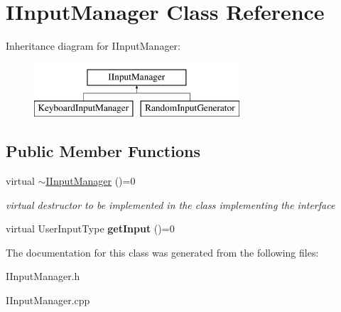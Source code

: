 \hypertarget{class_i_input_manager}{}\section{I\+Input\+Manager Class Reference}
\label{class_i_input_manager}
Inheritance diagram for I\+Input\+Manager\+:\begin{figure}[H]
\begin{center}
\leavevmode
\includegraphics[height=2.000000cm]{class_i_input_manager}
\end{center}
\end{figure}
\subsection*{Public Member Functions}
\begin{DoxyCompactItemize}
\item 
\mbox{\label{class_i_input_manager_aa81a10b1ddf305df10c4aebe6930ac86}} 
virtual \mbox{\hyperlink{class_i_input_manager_aa81a10b1ddf305df10c4aebe6930ac86}{$\sim$\+I\+Input\+Manager}} ()=0
\begin{DoxyCompactList}\small\item\em virtual destructor to be implemented in the class implementing the interface \end{DoxyCompactList}\item 
\mbox{\label{class_i_input_manager_afa367fc9694f45150aeb59039dcd4421}} 
virtual User\+Input\+Type {\bfseries get\+Input} ()=0
\end{DoxyCompactItemize}


The documentation for this class was generated from the following files\+:\begin{DoxyCompactItemize}
\item 
I\+Input\+Manager.\+h\item 
I\+Input\+Manager.\+cpp\end{DoxyCompactItemize}
